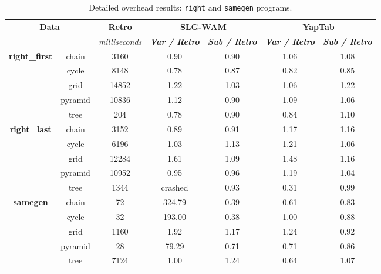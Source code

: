 \begin{table}[ht]
\centering
\footnotesize{
  \begin{tabular}{cc|c|cc|cc}
   \hline
    \hline
    \multicolumn{2}{c|}{\multirow{2}{*}{\small{\textbf{Data}}}} & \textbf{\small{Retro}} & \multicolumn{2}{c|}{\small{\textbf{SLG-WAM}}} & \multicolumn{2}{c}{\small{\textbf{YapTab}}} \\
     \multicolumn{2}{c|}{} & \scriptsize{\textit{milliseconds}} & \textbf{\textit{\scriptsize{Var / Retro}}} & \textbf{\textit{\scriptsize{Sub / Retro}}} & \textbf{\textit{\scriptsize{Var / Retro}}} & \textbf{\textit{\scriptsize{Sub / Retro}}} \\
   \hline
   \hline
\multirow{5}{*}{\textbf{right\_first}} &  chain &  3160 &  0.90  &  0.90  &  1.06 & 1.08 \\
&  cycle &  8148 &  0.78  &  0.87  &  0.82 & 0.85 \\
&  grid &  14852 &  1.22  &  1.03  &  1.06 & 1.22 \\
&  pyramid &  10836 &  1.12  &  0.90  &  1.09 & 1.06 \\
&  tree &  204 &  0.78  &  0.90  &  0.84 & 1.10 \\
\hline
\multirow{5}{*}{\textbf{right\_last}} &  chain &  3152 &  0.89  &  0.91  &  1.17 & 1.16 \\
&  cycle &  6196 &  1.03  &  1.13  &  1.21 & 1.06 \\
&  grid &  12284 &  1.61  &  1.09  &  1.48 & 1.16 \\
&  pyramid &  10952 &  0.95  &  0.96  &  1.19 & 1.04 \\
&  tree &  1344 &  \scriptsize{crashed}  &  0.93  &  0.31 & 0.99 \\
\hline
\multirow{5}{*}{\textbf{samegen}} &  chain &  72 &  324.79  &  0.39  &  0.61 & 0.83 \\
&  cycle &  32 &  193.00  &  0.38  &  1.00 & 0.88 \\
&  grid &  1160 &  1.92  &  1.17  &  1.24 & 0.92 \\
&  pyramid &  28 &  79.29  &  0.71  &  0.71 & 0.86 \\
&  tree &  7124 &  1.00  &  1.24  &  0.64 & 1.07 \\
\hline
\hline
\end{tabular}
}
\caption{Detailed overhead results: \texttt{right} and \texttt{samegen} programs.}
\label{tbl:overhead_detail_tst2}
\end{table}